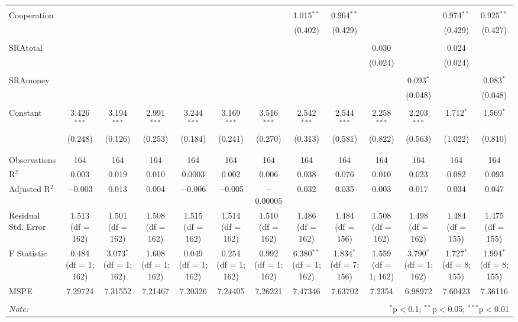 \documentclass[12pt]{article}
\begin{document}
\begin{table}[!htbp]
\begin{adjustbox}{width=\textwidth}
\begin{tabular}{@{\extracolsep{5pt}}lcccccccccccc}
  & & & & & & & & & & & & \\ 
 Cooperation &  &  &  &  &  &  & 1.015$^{**}$ & 0.964$^{**}$ &  &  & 0.974$^{**}$ & 0.925$^{**}$ \\ 
  &  &  &  &  &  &  & (0.402) & (0.429) &  &  & (0.429) & (0.427) \\ 
  & & & & & & & & & & & & \\ 
 SRAtotal &  &  &  &  &  &  &  &  & 0.030 &  & 0.024 &  \\ 
  &  &  &  &  &  &  &  &  & (0.024) &  & (0.024) &  \\ 
  & & & & & & & & & & & & \\ 
 SRAmoney &  &  &  &  &  &  &  &  &  & 0.093$^{*}$ &  & 0.083$^{*}$ \\ 
  &  &  &  &  &  &  &  &  &  & (0.048) &  & (0.048) \\ 
  & & & & & & & & & & & & \\ 
 Constant & 3.426$^{***}$ & 3.194$^{***}$ & 2.991$^{***}$ & 3.244$^{***}$ & 3.169$^{***}$ & 3.516$^{***}$ & 2.542$^{***}$ & 2.544$^{***}$ & 2.258$^{***}$ & 2.203$^{***}$ & 1.712$^{*}$ & 1.569$^{*}$ \\ 
  & (0.248) & (0.126) & (0.253) & (0.184) & (0.241) & (0.270) & (0.313) & (0.581) & (0.822) & (0.563) & (1.022) & (0.810) \\ 
  & & & & & & & & & & & & \\ 
\hline \\[-1.8ex] 
Observations & 164 & 164 & 164 & 164 & 164 & 164 & 164 & 164 & 164 & 164 & 164 & 164 \\ 
R$^{2}$ & 0.003 & 0.019 & 0.010 & 0.0003 & 0.002 & 0.006 & 0.038 & 0.076 & 0.010 & 0.023 & 0.082 & 0.093 \\ 
Adjusted R$^{2}$ & $-$0.003 & 0.013 & 0.004 & $-$0.006 & $-$0.005 & $-$0.00005 & 0.032 & 0.035 & 0.003 & 0.017 & 0.034 & 0.047 \\ 
Residual Std. Error & 1.513 (df = 162) & 1.501 (df = 162) & 1.508 (df = 162) & 1.515 (df = 162) & 1.514 (df = 162) & 1.510 (df = 162) & 1.486 (df = 162) & 1.484 (df = 156) & 1.508 (df = 162) & 1.498 (df = 162) & 1.484 (df = 155) & 1.475 (df = 155) \\ 
F Statistic & 0.484 (df = 1; 162) & 3.073$^{*}$ (df = 1; 162) & 1.608 (df = 1; 162) & 0.049 (df = 1; 162) & 0.254 (df = 1; 162) & 0.992 (df = 1; 162) & 6.380$^{**}$ (df = 1; 162) & 1.834$^{*}$ (df = 7; 156) & 1.559 (df = 1; 162) & 3.790$^{*}$ (df = 1; 162) & 1.727$^{*}$ (df = 8; 155) & 1.994$^{*}$ (df = 8; 155) \\ 
MSPE & 7.29724 & 7.31552 & 7.21467 & 7.20326 & 7.24405 & 7.26221 & 7.47346 &7.63702 & 7.2354 & 6.98972 & 7.60423 & 7.36116 \\
\hline 
\hline \\[-1.8ex] 
\textit{Note:}  & \multicolumn{12}{r}{$^{*}$p$<$0.1; $^{**}$p$<$0.05; $^{***}$p$<$0.01} \\ 
\end{tabular} 
\end{adjustbox}
\end{table} 
\end{document}
